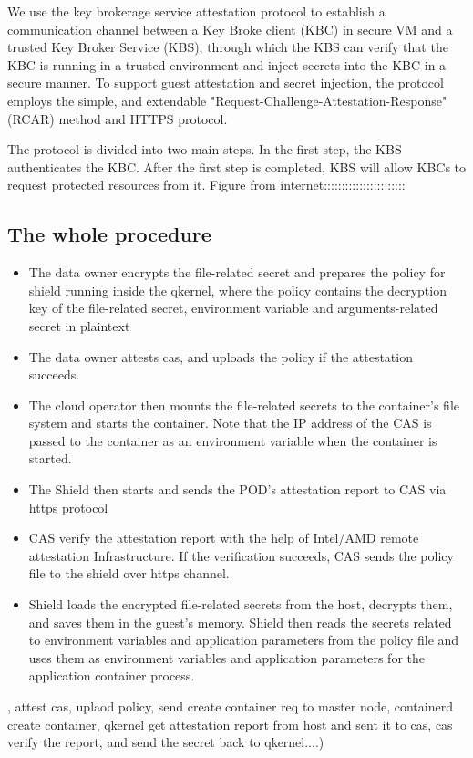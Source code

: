 We use the key brokerage service attestation protocol to establish a communication channel between a Key Broke client (KBC) in secure VM and a trusted Key Broker Service (KBS), 
through which the KBS can verify that the KBC is running in a trusted environment and inject secrets into the KBC in a secure manner.  To support guest attestation and secret injection, the protocol employs the simple, 
and extendable "Request-Challenge-Attestation-Response" (RCAR) method and HTTPS protocol. 

The protocol is divided into two main steps. In the first step, the KBS authenticates the KBC. After the first step is completed, KBS will allow KBCs to request protected resources from it.
Figure from internet:::::::::::::::::::::::

\subsection{The whole procedure}
\begin{itemize}
    \item  The data owner encrypts the file-related secret and prepares the policy for shield running inside the qkernel, where the policy contains the decryption key of the file-related secret, environment variable and arguments-related secret in plaintext
    \item  The data owner attests cas, and uploads the policy if the attestation succeeds.
    \item  The cloud operator then mounts the file-related secrets to the container's file system and starts the container. Note that the IP address of the CAS is passed to the container as an environment variable when the container is started.
    \item  The Shield then starts and sends the POD's attestation report to CAS via https protocol
    \item  CAS verify the attestation report with the help of Intel/AMD remote attestation Infrastructure. If the verification succeeds, CAS sends the policy file to the shield over https channel.
    \item  Shield loads the encrypted file-related secrets from the host, decrypts them, and saves them in the guest's memory. Shield then reads the secrets related to environment variables and application parameters from the policy file and uses them as environment variables and application parameters for the application container process.
\end{itemize}
, attest cas, uplaod policy, send create container req to master node, containerd create container, qkernel get attestation report from host and sent it to cas, cas verify the report, and send the secret back to qkernel....)

